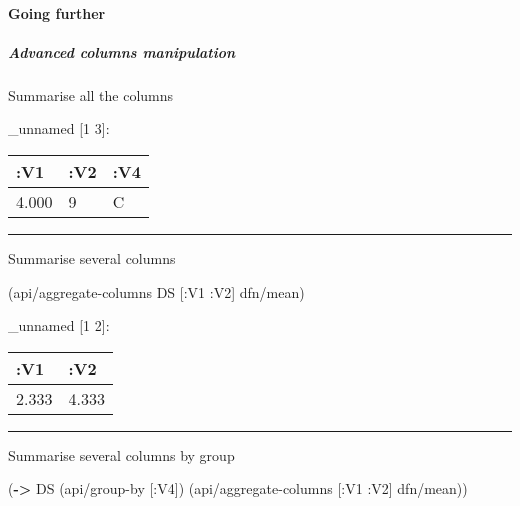 \documentclass[]{article}
\newenvironment{Shaded}{\begin{snugshade}}{\end{snugshade}}
\newcommand{\KeywordTok}[1]{\textcolor[rgb]{0.13,0.29,0.53}{\textbf{#1}}}
\newcommand{\CommentTok}[1]{\textcolor[rgb]{0.56,0.35,0.01}{\textit{#1}}}
\newcommand{\VariableTok}[1]{\textcolor[rgb]{0.00,0.00,0.00}{#1}}
\newcommand{\AttributeTok}[1]{\textcolor[rgb]{0.77,0.63,0.00}{#1}}
\newcommand{\NormalTok}[1]{#1}
\let\oldparagraph\paragraph
\renewcommand{\paragraph}[1]{\oldparagraph{#1}\mbox{}}
\let\oldsubparagraph\subparagraph
\renewcommand{\subparagraph}[1]{\oldsubparagraph{#1}\mbox{}}
\begin{document}
\paragraph{Going further}\label{going-further}

\subparagraph{Advanced columns
manipulation}\label{advanced-columns-manipulation}

Summarise all the columns

\begin{Shaded}
\end{Shaded}

\_unnamed {[}1 3{]}:

\begin{longtable}[]{@{}lll@{}}
\toprule
:V1 & :V2 & :V4\tabularnewline
\midrule
\endhead
4.000 & 9 & C\tabularnewline
\bottomrule
\end{longtable}

\begin{center}\rule{0.5\linewidth}{0.5pt}\end{center}

Summarise several columns

\begin{Shaded}
\begin{Highlighting}[]
\NormalTok{(api/aggregate-columns DS [}\AttributeTok{:V1} \AttributeTok{:V2}\NormalTok{] dfn/mean)}
\end{Highlighting}
\end{Shaded}

\_unnamed {[}1 2{]}:

\begin{longtable}[]{@{}ll@{}}
\toprule
:V1 & :V2\tabularnewline
\midrule
\endhead
2.333 & 4.333\tabularnewline
\bottomrule
\end{longtable}

\begin{center}\rule{0.5\linewidth}{0.5pt}\end{center}

Summarise several columns by group

\begin{Shaded}
\begin{Highlighting}[]
\NormalTok{(}\KeywordTok{->}\NormalTok{ DS}
\NormalTok{    (api/group-by [}\AttributeTok{:V4}\NormalTok{])}
\NormalTok{    (api/aggregate-columns [}\AttributeTok{:V1} \AttributeTok{:V2}\NormalTok{] dfn/mean))}
\end{Highlighting}
\end{Shaded}
\end{document}
